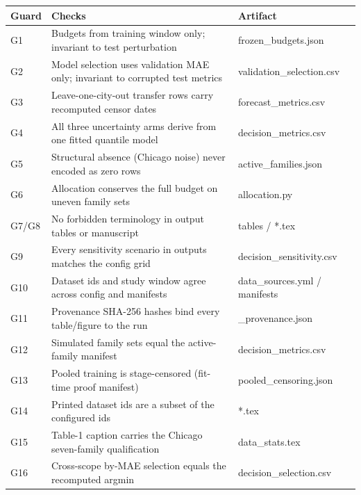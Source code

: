 \begin{tabular}{lll}
\toprule
Guard & Checks & Artifact \\
\midrule
G1 & Budgets from training window only; invariant to test perturbation & frozen\_budgets.json \\
G2 & Model selection uses validation MAE only; invariant to corrupted test metrics & validation\_selection.csv \\
G3 & Leave-one-city-out transfer rows carry recomputed censor dates & forecast\_metrics.csv \\
G4 & All three uncertainty arms derive from one fitted quantile model & decision\_metrics.csv \\
G5 & Structural absence (Chicago noise) never encoded as zero rows & active\_families.json \\
G6 & Allocation conserves the full budget on uneven family sets & allocation.py \\
G7/G8 & No forbidden terminology in output tables or manuscript & tables / *.tex \\
G9 & Every sensitivity scenario in outputs matches the config grid & decision\_sensitivity.csv \\
G10 & Dataset ids and study window agree across config and manifests & data\_sources.yml / manifests \\
G11 & Provenance SHA-256 hashes bind every table/figure to the run & \_provenance.json \\
G12 & Simulated family sets equal the active-family manifest & decision\_metrics.csv \\
G13 & Pooled training is stage-censored (fit-time proof manifest) & pooled\_censoring.json \\
G14 & Printed dataset ids are a subset of the configured ids & *.tex \\
G15 & Table-1 caption carries the Chicago seven-family qualification & data\_stats.tex \\
G16 & Cross-scope by-MAE selection equals the recomputed argmin & decision\_selection.csv \\
\bottomrule
\end{tabular}
